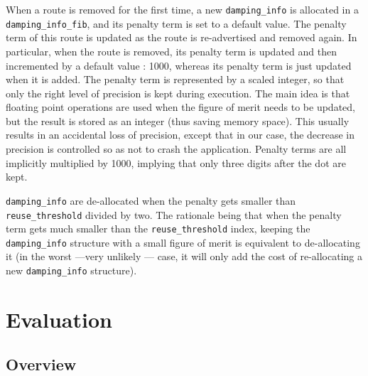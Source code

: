 \documentclass[a4paper,english]{IEEEtran}
\begin{document}
When a route is removed for the first time, a new {\tt\small damping\_info} 
is allocated in a {\tt\small damping\_info\_fib}, and its penalty term is set to 
a default value. The penalty term of this route is updated as the route is re-advertised
and removed again. In particular, when the route is removed, its penalty term is
updated and then incremented by a default value : 1000, whereas its penalty term is just
updated when it is added. The penalty term is represented by a scaled integer,
so that only the right level of precision is kept during execution.
The main idea is that floating point operations are used when the figure of merit needs
to be updated, but the result is stored as an integer (thus saving memory space).
This usually results in an accidental loss of precision, except that in our case,
the decrease in precision is controlled so as not to crash the application. 
Penalty terms are all implicitly multiplied by 1000, implying that only three digits 
after the dot are kept.

{\tt\small damping\_info} are de-allocated when the penalty gets smaller than
{\tt\small reuse\_threshold} divided by two. The rationale being that when the penalty
term gets much smaller than the {\tt\small reuse\_threshold} index, keeping the 
{\tt\small damping\_info} structure with a small figure of merit is equivalent to de-allocating it 
(in the worst ---very unlikely --- case, it will only add the cost of re-allocating a 
new {\tt\small damping\_info} structure).

\section{Evaluation}

\subsection{Overview}
\end{document}
